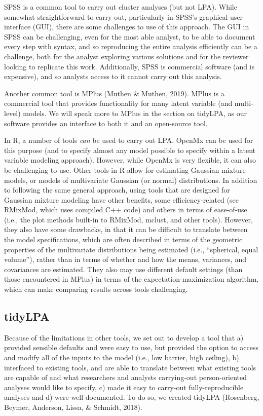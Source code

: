 \documentclass[man]{apa6}
\begin{document}
SPSS is a common tool to carry out cluster analyses (but not LPA). While
somewhat straightforward to carry out, particularly in SPSS's graphical user
interface (GUI), there are some challenges to use of this approach. The GUI in
SPSS can be challenging, even for the most able analyst, to be able to document
every step with syntax, and so reproducing the entire analysis efficiently can
be a challenge, both for the analyst exploring various solutions and for the
reviewer looking to replicate this work. Additionally, SPSS is commercial
software (and is expensive), and so analysts access to it cannot carry out this
analysis.

Another common tool is MPlus (Muthen \& Muthen, 2019). MPlus is a commercial tool
that provides functionality for many latent variable (and multi-level) models.
We will speak more to MPlus in the section on tidyLPA, as our software provides
an interface to both it and an open-source tool.

In R, a number of tools \emph{can} be used to carry out LPA. OpenMx can be used for
this purpose (and to specify almost any model possible to specify within a
latent variable modeling approach). However, while OpenMx is very flexible, it
can also be challenging to use. Other tools in R allow for estimating Gaussian
mixture models, or models of multivariate Gaussian (or normal) distributions. In
addition to following the same general approach, using tools that are designed
for Gaussian mixture modeling have other benefits, some efficiency-related (see
RMixMod, which uses compiled C++ code) and others in terms of ease-of-use (i.e.,
the plot methods built-in to RMixMod, mclust, and other tools). However, they
also have some drawbacks, in that it can be difficult to translate between the
model specifications, which are often described in terms of the geometric
properties of the multivariate distributions being estimated (i.e., ``spherical,
equal volume''), rather than in terms of whether and how the means, variances,
and covariances are estimated. They also may use different default settings
(than those encountered in MPlus) in terms of the expectation-maximization
algorithm, which can make comparing results across tools challenging.

\hypertarget{tidylpa}{%
\subsection{tidyLPA}\label{tidylpa}}

Because of the limitations in other tools, we set out to develop a tool that a)
provided sensible defaults and were easy to use, but provided the option to
access and modify all of the inputs to the model (i.e., low barrier, high
ceiling), b) interfaced to existing tools, and are able to translate between
what existing tools are capable of and what researchers and analysts
carrying-out person-oriented analyses would like to specify, c) made it easy to
carry-out fully-reproducible analyses and d) were well-documented. To do so, we
created tidyLPA (Rosenberg, Beymer, Anderson, Lissa, \& Schmidt, 2018).
\end{document}
